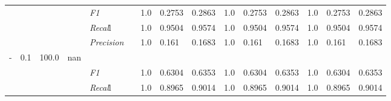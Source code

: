 \begin{table}[]
\begin{tabularx}{\textwidth}{XXlllllllllllll@{}}
                                                                    &                                                                     &                                                           &    & \textit{F1} &                                                      & 1.0        & 0.2753        & 0.2863        & 1.0        & 0.2753        & 0.2863        & 1.0        & 0.2753        & 0.2863        \\
                                                                    &                                                                     &                                                           &    & \textit{Recal}l &                                                      & 1.0    & 0.9504    & 0.9574    & 1.0    & 0.9504    & 0.9574    & 1.0    & 0.9504    & 0.9574    \\
                                                                    &                                                                     &                                                           &    & \textit{Precision} &                                                      & 1.0 & 0.161 & 0.1683 & 1.0 & 0.161 & 0.1683 & 1.0 & 0.161 & 0.1683 \\ \midrule
- & 0.1 & 100.0 & nan &                                                              &                                                                   &                                                             &                                                               &                                                                    &                                                              &                                                               &                                                                    &                                                              \\
                                                                    &                                                                     &                                                           &    & \textit{F1} &                                                      & 1.0        & 0.6304        & 0.6353        & 1.0        & 0.6304        & 0.6353        & 1.0        & 0.6304        & 0.6353        \\
                                                                    &                                                                     &                                                           &    & \textit{Recal}l &                                                      & 1.0    & 0.8965    & 0.9014    & 1.0    & 0.8965    & 0.9014    & 1.0    & 0.8965    & 0.9014    \\

\end{tabularx}
\end{table}
